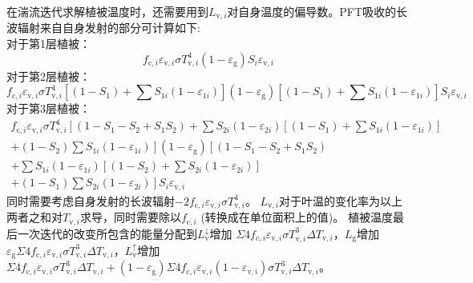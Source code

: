 在湍流迭代求解植被温度时，还需要用到$L_{{\mathrm v},i}$对自身温度的偏导数。PFT吸收的长波辐射来自自身发射的部分可计算如下: \\
%
对于第1层植被：
\begin{equation}\label{eq:dlv1}
  f_{{\mathrm c},i} \varepsilon_{{\mathrm v},i} \sigma T_{{\mathrm v},i}^{4}\left(1-\varepsilon_{\mathrm{g}}\right) S_{i} \varepsilon_{\mathrm{v},i}
\end{equation}
对于第2层植被：
\begin{equation}\label{eq:dlv2}
  f_{{\mathrm c},i} \varepsilon_{{\mathrm v},i} \sigma T_{{\mathrm v},i}^{4}\left[\left(1-S_{1}\right)+\sum S_{1 i}\left(1-\varepsilon_{1 i}\right)\right]
  \left(1-\varepsilon_{\mathrm{g}}\right)\left[\left(1-S_{1}\right)+\sum S_{1 i}\left(1-\varepsilon_{1 i}\right)\right] S_{i} \varepsilon_{\mathrm{v},i}
\end{equation}
对于第3层植被：
\begin{equation}\label{eq:dlv3}
  \begin{aligned}
    f_{\mathrm{c},i} \varepsilon_{\mathrm{v},i} \sigma T_{\mathrm{v},i}^{4}\left[\left(1-S_{1}-S_{2}+S_{1} S_{2}\right)+
    \sum S_{2 i}\left(1-\varepsilon_{2 i}\right)\left[\left(1-S_{1}\right)+\sum S_{1 i}\left(1-\varepsilon_{1 i}\right)\right]\right.\\[1ex]
    \left.+\left(1-S_{2}\right) \sum S_{1 i}\left(1-\varepsilon_{1 i}\right)\right]\left(1-\varepsilon_{\mathrm{g}}\right)\left[\left(1-S_{1}-S_{2}+S_{1} S_{2}\right)\right.\\[1ex]
    +\sum S_{1 i}\left(1-\varepsilon_{1 i}\right)\left[\left(1-S_{2}\right)+\sum S_{2 i}\left(1-\varepsilon_{2 i}\right)\right] \\[1ex]
    \left.+\left(1-S_{1}\right)
    \sum S_{2 i}\left(1-\varepsilon_{2 i}\right)\right] S_{i} \varepsilon_{\mathrm{v},i}
  \end{aligned}
\end{equation}
同时需要考虑自身发射的长波辐射$-2f_{\mathrm{c},i}\varepsilon_{\mathrm{v},i}\sigma T_{\mathrm{v},i}^4$。
$L_{\mathrm{v},i}$对于叶温的变化率为以上两者之和对$T_{\mathrm{v},i}$求导，同时需要除以$f_{\mathrm{c},i}$ (转换成在单位面积上的值)。
植被温度最后一次迭代的改变所包含的能量分配到$L_{\mathrm {v}} ^\downarrow$增加
$\Sigma4f_{\mathrm{c},i}\varepsilon_{\mathrm{v},i}\sigma T_{\mathrm{v},i}^3\Delta T_{\mathrm{v},i}$，$L_{\mathrm{g}}$增加$\varepsilon_{\mathrm {g}}\Sigma4f_{\mathrm{c},i}\varepsilon_{\mathrm{v},i}\sigma T_{\mathrm{v},i}^3\Delta T_{\mathrm{v},i}$，$L_{\mathrm {v}} ^\uparrow$增加$\Sigma 4 f_{\mathrm{c},i} \varepsilon_{\mathrm{v},i} \sigma T_{\mathrm{v},i}^{3} \Delta T_{\mathrm{v},i}+\left(1-\varepsilon_{\mathrm{g}}\right) \Sigma 4 f_{\mathrm{c},i} \varepsilon_{\mathrm{v},i}\left(1-\varepsilon_{\mathrm{v},i}\right) \sigma T_{\mathrm{v},i}^{3} \Delta T_{\mathrm{v},i}$。


